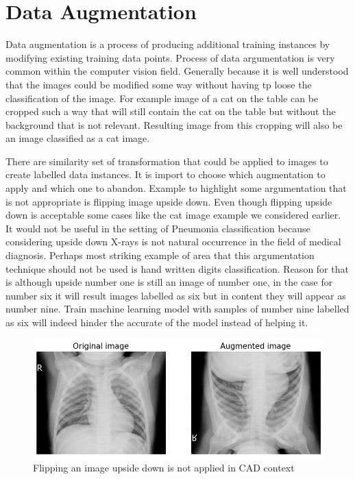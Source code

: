 \section{Data Augmentation}
Data augmentation is a process of producing additional training instances by modifying existing training data points.
Process of data argumentation is very common within the computer vision field.
Generally because it is well understood that the images could be modified some way without having tp loose the classification of the image.
For example image of a cat on the table can be cropped such a way that will still contain the cat on the table but without the background that is not relevant.
Resulting image from this cropping will also be an image classified as a cat image.

There are similarity set of transformation that could be applied to images to create labelled data instances. 
It is import to choose which augmentation to apply and which one to abandon.
Example to highlight some argumentation that is not appropriate is flipping image upside down. 
Even though flipping upside down is acceptable some cases like the cat image example we considered earlier. 
It would not be useful in the setting of Pneumonia classification because considering upside down X-rays is not natural occurrence in the field of medical diagnosis.
Perhaps most striking example of area that this argumentation technique should not be used is hand written digits classification. 
Reason for that is although upside number one is still an image of number one, in the case for number six it will result images labelled as six but in content they will appear as number nine. 
Train machine learning model with samples of number nine labelled as six will indeed hinder the accurate of the model instead of helping it.

\begin{figure}[H]
    \centering
    \includegraphics[width=\textwidth]{img/augmented-image-1588951790.png}
    \caption{Flipping an image upside down is not applied in CAD context}
    \label{fig:upsidedownxray}
  \end{figure}


